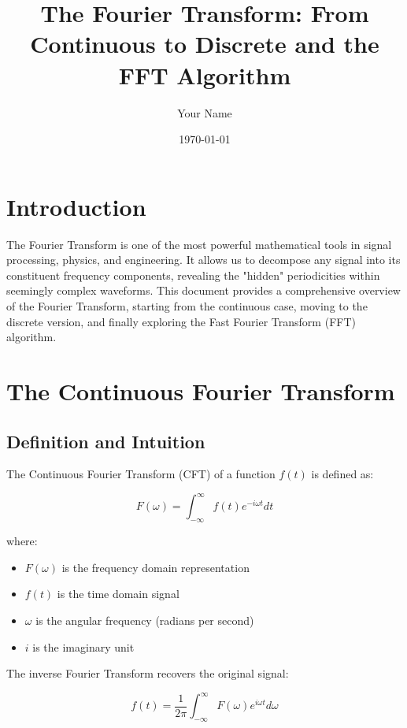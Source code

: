 \documentclass[11pt,a4paper]{article}
\title{The Fourier Transform: From Continuous to Discrete and the FFT Algorithm}
\author{Your Name}
\date{\today}
\begin{document}
\maketitle

\tableofcontents
\newpage

\section{Introduction}

The Fourier Transform is one of the most powerful mathematical tools in signal processing, physics, and engineering. It allows us to decompose any signal into its constituent frequency components, revealing the "hidden" periodicities within seemingly complex waveforms. This document provides a comprehensive overview of the Fourier Transform, starting from the continuous case, moving to the discrete version, and finally exploring the Fast Fourier Transform (FFT) algorithm.

\section{The Continuous Fourier Transform}

\subsection{Definition and Intuition}

The Continuous Fourier Transform (CFT) of a function $f(t)$ is defined as:

\begin{equation}
F(\omega) = \int_{-\infty}^{\infty} f(t) e^{-i\omega t} dt
\end{equation}

where:
\begin{itemize}
    \item $F(\omega)$ is the frequency domain representation
    \item $f(t)$ is the time domain signal
    \item $\omega$ is the angular frequency (radians per second)
    \item $i$ is the imaginary unit
\end{itemize}

The inverse Fourier Transform recovers the original signal:

\begin{equation}
f(t) = \frac{1}{2\pi} \int_{-\infty}^{\infty} F(\omega) e^{i\omega t} d\omega
\end{equation}
\end{document}

